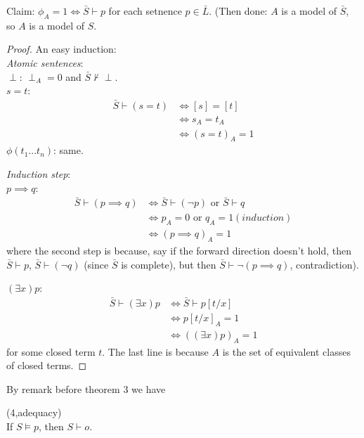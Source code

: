 \documentclass[a4paper]{article}
\begin{document}
Claim: $\phi_A = 1 \iff \bar{S} \vdash p$ for each setnence $p \in \bar{L}$. (Then done: $A$ is a model of $\bar{S}$, so $A$ is a model of $S$.
\begin{proof}
An easy induction:\\
\emph{Atomic sentences}:\\
$\perp$: $\perp_A = 0$ and $\bar{S} \not\vdash \perp$.\\
$s=t$: 
\begin{equation*}
\begin{aligned}
\bar{S} \vdash (s=t) &\iff [s] = [t]\\
&\iff s_A = t_A\\
&\iff (s=t)_A = 1
\end{aligned}
\end{equation*}
$\phi(t_1...t_n)$: same.

\emph{Induction step}:\\
$p \implies q$: 
\begin{equation*}
\begin{aligned}
\bar{S} \vdash (p \implies q) &\iff \bar{S} \vdash (\neg p)\text{ or } \bar{S} \vdash q\\
&\iff p_A = 0\text{ or } q_A = 1 (induction)\\
&\iff (p \implies q)_A =1 
\end{aligned}
\end{equation*}
where the second step is because, say if the forward direction doesn't hold, then $\bar{S} \vdash p$, $\bar{S} \vdash (\neg q)$ (since $\bar{S}$ is complete), but then $\bar{S} \vdash \neg(p \implies q)$, contradiction).

$(\exists x) p$:
\begin{equation*}
\begin{aligned}
\bar{S} \vdash (\exists x) p &\iff \bar{S} \vdash p[t/x]\\
&\iff p[t/x]_A = 1\\
&\iff ((\exists x)p)_A = 1
\end{aligned}
\end{equation*}
for some closed term $t$. The last line is because $A$ is the set of equivalent classes of closed terms.
\end{proof}

By remark before theorem 3 we have

\begin{coro} (4,adequacy)\\
If $S \vDash p$, then $S \vdash o$.
\end{coro}
\end{document}
